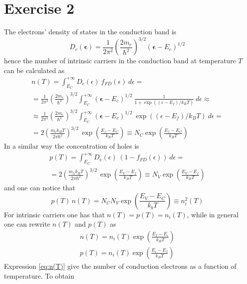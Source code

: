 \documentclass{article}
\begin{document}
\newpage

\section*{Exercise 2}
The electrons' density of states in the conduction band is 
\begin{equation*}
    D_{e}(\boldsymbol{\epsilon})=\frac{1}{2 \pi^{2}}\left(\frac{2 m_{e}}{\hbar^{2}}\right)^{3 / 2}\left(\boldsymbol{\epsilon}-E_{c}\right)^{1 / 2}
\end{equation*}
hence the number of intrinsic carriers in the conduction band at temperature $T$ can be calculated as 
\begin{gather*}
    n(T) = \int_{E_C}^{+\infty} D_e(\epsilon) \ f_{FD}(\epsilon) \ d\epsilon = \\
    = \frac{1}{2 \pi^{2}}\left(\frac{2 m_{e}}{\hbar^{2}}\right)^{3 / 2}\int_{E_C}^{+\infty} \left(\boldsymbol{\epsilon}-E_{c}\right)^{1 / 2} \ \frac{1}{1+\exp\left((\epsilon - E_f)/k_BT\right)} \ d\epsilon \approx \\ 
    \approx \frac{1}{2 \pi^{2}}\left(\frac{2 m_{e}}{\hbar^{2}}\right)^{3 / 2}\int_{E_C}^{+\infty} \left(\boldsymbol{\epsilon}-E_{c}\right)^{1 / 2} \ \exp\left((\epsilon-E_f)/k_BT\right) \ d\epsilon = \\
    = 2 \left(\frac{m_ek_BT}{2\pi\hbar^2}\right)^{3/2} \, \exp\left(\frac{E_f-E_C}{k_BT}\right) \equiv N_C \exp\left(\frac{E_f-E_C}{k_BT}\right)
\end{gather*} 
In a similar way the concentration of holes is 
\begin{gather*}
    p(T) = \int_{E_C}^{+\infty} D_e(\epsilon) \ \left(1-f_{FD}(\epsilon)\right) \ d\epsilon = \\
    = 2 \left(\frac{m_hk_BT}{2\pi\hbar^2}\right)^{3/2} \, \exp\left(\frac{E_V-E_f}{k_BT}\right) \equiv N_V \exp\left(\frac{E_V-E_f}{k_BT}\right)
\end{gather*}
and one can notice that  
\begin{equation*}
    p(T) \, n(T) = N_CN_V \exp\left(\frac{E_V-E_C}{k_bT}\right) \equiv n_i^2(T)
\end{equation*}
For intrinsic carriers one has that $n(T)=p(T)=n_i(T)$, while in general one can rewrite $n(T)$ and $p(T)$ as
\begin{gather}
    n(T) = n_i(T)\exp\left(\frac{E_f-E_i}{k_BT}\right) 
    \label{eq:n(T)} \\
    p(T) = n_i(T)\exp\left(\frac{E_i-E_f}{k_BT}\right)
\end{gather}
Expression \ref{eq:n(T)} give the number of conduction electrons as a function of temperature. To obtain
\end{document}
